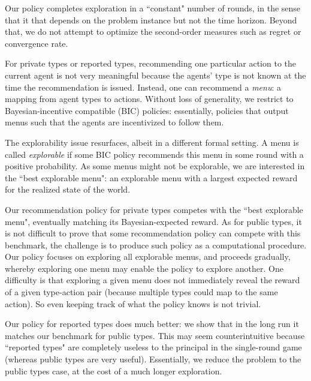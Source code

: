 Our policy completes exploration in a ``constant" number of rounds, in the sense that it that depends on the problem instance but not the time horizon. Beyond that, we do not attempt to optimize the second-order measures such as regret or convergence rate.

For private types or reported types, recommending one particular action to the current agent is not very meaningful because the agents' type is not known at the time the recommendation is issued. Instead, one can recommend a \emph{menu}: a mapping from agent types to actions. Without loss of generality, we restrict to  Bayesian-incentive compatible (BIC) policies: essentially, policies that output menus such that the agents are incentivized to follow them.

The explorability issue resurfaces, albeit in a different formal setting. A menu is called \emph{explorable} if some BIC policy recommends this menu in some round with a positive probability. As some menus might not be explorable, we are interested in the ``best explorable menu": an explorable menu with a largest expected reward for the realized state of the world.

Our recommendation policy for private types competes with the ``best explorable menu", eventually matching its Bayesian-expected reward. As for public types, it is not difficult to prove that some recommendation policy can compete with this benchmark, the challenge is to produce such policy as a computational procedure. Our policy focuses on exploring all explorable menus, and proceeds gradually, whereby exploring one menu may enable the policy to explore another. One difficulty is that exploring a given menu does not immediately reveal the reward of a given type-action pair (because multiple types could map to the same action). So even keeping track of what the policy knows is not trivial.
 
Our policy for reported types does much better: we show that in the long run it matches our benchmark for public types. This may seem counterintuitive because ``reported types" are completely useless to the principal in the single-round game (whereas public types are very useful). Essentially, we reduce the problem to the public types case, at the cost of a much longer exploration.


